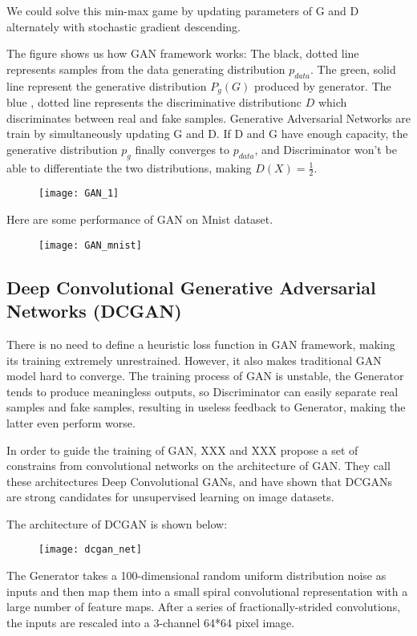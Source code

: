 We could solve this min-max game by updating parameters of G and D alternately with stochastic gradient descending.

The figure shows us how GAN framework works: The black, dotted line represents samples from the data generating distribution $p_{data}$. The green, solid line represent the generative distribution $P_g(G)$ produced by generator. The blue , dotted line represents the discriminative distributionc $D$ which discriminates between real and fake samples. Generative Adversarial Networks are train by simultaneously updating G and D. If D and G have enough capacity, the generative distribution $p_g$ finally converges to $p_{data}$, and Discriminator won't be able to differentiate the two distributions, making $D(X)=\frac{1}{2}$.
\begin{figure}
	\centering
	\texttt{[image: GAN\_1]}
	\label{fig:7}
\end{figure}

Here are some performance of GAN on Mnist dataset.
\begin{figure}
	\centering
	\texttt{[image: GAN\_mnist]}
	\label{fig:8}
\end{figure}
\subsection{Deep Convolutional Generative Adversarial Networks (DCGAN)}
There is no need to define a heuristic loss function in GAN framework, making its training extremely unrestrained. However, it also makes traditional GAN model hard to converge. The training process of GAN is unstable, the Generator tends to produce meaningless outputs, so Discriminator can easily separate real samples and fake samples, resulting in useless feedback to Generator, making the latter even perform worse.

In order to guide the training of GAN, XXX and XXX propose a set of constrains from convolutional networks on the architecture of GAN. They call these architectures Deep Convolutional GANs, and have shown that DCGANs are strong candidates for unsupervised learning on image datasets.

The architecture of DCGAN is shown below: 
\begin{figure}
	\centering
	\texttt{[image: dcgan\_net]}
	\label{fig:9}
\end{figure}
The Generator takes a 100-dimensional random uniform distribution noise as inputs and then map them into a small spiral convolutional representation with a large number of feature maps. After a series of fractionally-strided convolutions, the inputs are rescaled into a 3-channel 64*64 pixel image. 

